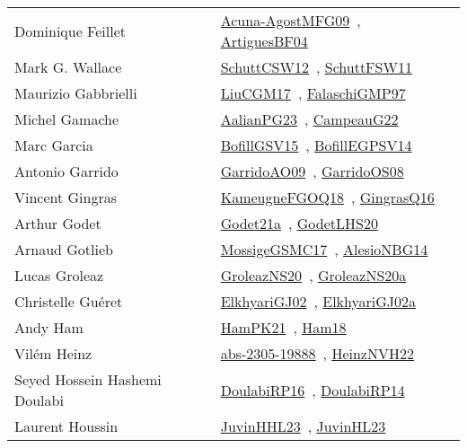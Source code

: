 {\begin{longtable}{p{4cm}p{20cm}}
Dominique Feillet & \href{works/Acuna-AgostMFG09.pdf}{Acuna-AgostMFG09}~\cite{Acuna-AgostMFG09}, \href{works/ArtiguesBF04.pdf}{ArtiguesBF04}~\cite{ArtiguesBF04}\\
Mark G. Wallace & \href{works/SchuttCSW12.pdf}{SchuttCSW12}~\cite{SchuttCSW12}, \href{works/SchuttFSW11.pdf}{SchuttFSW11}~\cite{SchuttFSW11}\\
Maurizio Gabbrielli & \href{works/LiuCGM17.pdf}{LiuCGM17}~\cite{LiuCGM17}, \href{works/FalaschiGMP97.pdf}{FalaschiGMP97}~\cite{FalaschiGMP97}\\
Michel Gamache & \href{works/AalianPG23.pdf}{AalianPG23}~\cite{AalianPG23}, \href{works/CampeauG22.pdf}{CampeauG22}~\cite{CampeauG22}\\
Marc Garcia & \href{works/BofillGSV15.pdf}{BofillGSV15}~\cite{BofillGSV15}, \href{works/BofillEGPSV14.pdf}{BofillEGPSV14}~\cite{BofillEGPSV14}\\
Antonio Garrido & \href{works/GarridoAO09.pdf}{GarridoAO09}~\cite{GarridoAO09}, \href{works/GarridoOS08.pdf}{GarridoOS08}~\cite{GarridoOS08}\\
Vincent Gingras & \href{works/KameugneFGOQ18.pdf}{KameugneFGOQ18}~\cite{KameugneFGOQ18}, \href{works/GingrasQ16.pdf}{GingrasQ16}~\cite{GingrasQ16}\\
Arthur Godet & \href{}{Godet21a}~\cite{Godet21a}, \href{works/GodetLHS20.pdf}{GodetLHS20}~\cite{GodetLHS20}\\
Arnaud Gotlieb & \href{works/MossigeGSMC17.pdf}{MossigeGSMC17}~\cite{MossigeGSMC17}, \href{works/AlesioNBG14.pdf}{AlesioNBG14}~\cite{AlesioNBG14}\\
Lucas Groleaz & \href{works/GroleazNS20.pdf}{GroleazNS20}~\cite{GroleazNS20}, \href{works/GroleazNS20a.pdf}{GroleazNS20a}~\cite{GroleazNS20a}\\
Christelle Gu{\'{e}}ret & \href{works/ElkhyariGJ02.pdf}{ElkhyariGJ02}~\cite{ElkhyariGJ02}, \href{works/ElkhyariGJ02a.pdf}{ElkhyariGJ02a}~\cite{ElkhyariGJ02a}\\
Andy Ham & \href{works/HamPK21.pdf}{HamPK21}~\cite{HamPK21}, \href{}{Ham18}~\cite{Ham18}\\
Vil{\'{e}}m Heinz & \href{works/abs-2305-19888.pdf}{abs-2305-19888}~\cite{abs-2305-19888}, \href{works/HeinzNVH22.pdf}{HeinzNVH22}~\cite{HeinzNVH22}\\
Seyed Hossein Hashemi Doulabi & \href{}{DoulabiRP16}~\cite{DoulabiRP16}, \href{works/DoulabiRP14.pdf}{DoulabiRP14}~\cite{DoulabiRP14}\\
Laurent Houssin & \href{works/JuvinHHL23.pdf}{JuvinHHL23}~\cite{JuvinHHL23}, \href{works/JuvinHL23.pdf}{JuvinHL23}~\cite{JuvinHL23}\\

\end{longtable}}

